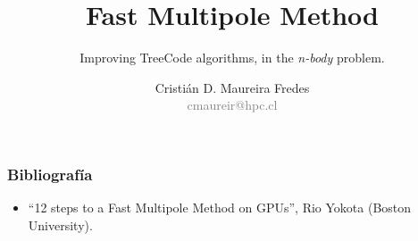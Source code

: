 \documentclass{beamer}
\author[Cristián D. Maureira Fredes]{\large Cristián D. Maureira Fredes\\\normalsize \textcolor{gray}{cmaureir@hpc.cl}}
\title[Fast Multipole Method (FMM)]{\Huge Fast Multipole Method}
\subtitle{Improving TreeCode algorithms, in the \emph{n-body} problem.}
\institute{Universidad Técnica\\ Federico Santa María}
\begin{document}
\begin{frame}[t,plain]
\titlepage
\end{frame}



\begin{frame}
\frametitle{Bibliografía}
\begin{itemize}
    \item ``12 steps to a Fast Multipole Method on GPUs'', Rio Yokota (Boston University).
\end{itemize}
\end{frame}
\begin{frame}[t,plain]
\titlepage
\end{frame}
\end{document}
